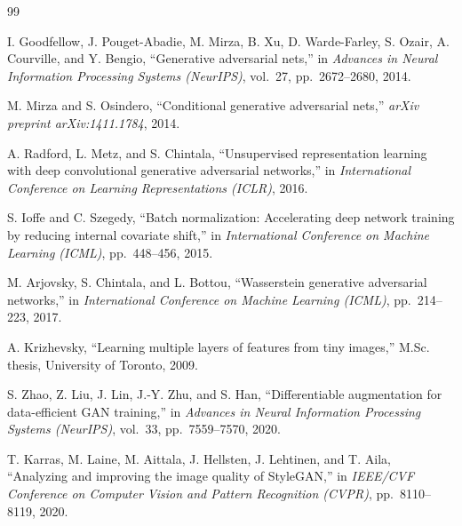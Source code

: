 \documentclass[conference]{IEEEtran}
\begin{document}

\begin{thebibliography}{99}

I. Goodfellow, J. Pouget-Abadie, M. Mirza, B. Xu, D. Warde-Farley, S. Ozair, A. Courville, and Y. Bengio,
``Generative adversarial nets,''
in \emph{Advances in Neural Information Processing Systems (NeurIPS)}, vol.~27, pp.~2672--2680, 2014.

M. Mirza and S. Osindero,
``Conditional generative adversarial nets,''
\emph{arXiv preprint arXiv:1411.1784}, 2014.

A. Radford, L. Metz, and S. Chintala,
``Unsupervised representation learning with deep convolutional generative adversarial networks,''
in \emph{International Conference on Learning Representations (ICLR)}, 2016.

S. Ioffe and C. Szegedy,
``Batch normalization: Accelerating deep network training by reducing internal covariate shift,''
in \emph{International Conference on Machine Learning (ICML)}, pp.~448--456, 2015.

M. Arjovsky, S. Chintala, and L. Bottou,
``Wasserstein generative adversarial networks,''
in \emph{International Conference on Machine Learning (ICML)}, pp.~214--223, 2017.

A. Krizhevsky,
``Learning multiple layers of features from tiny images,''
M.Sc. thesis, University of Toronto, 2009.

S. Zhao, Z. Liu, J. Lin, J.-Y. Zhu, and S. Han,
``Differentiable augmentation for data-efficient GAN training,''
in \emph{Advances in Neural Information Processing Systems (NeurIPS)}, vol.~33, pp.~7559--7570, 2020.

T. Karras, M. Laine, M. Aittala, J. Hellsten, J. Lehtinen, and T. Aila,
``Analyzing and improving the image quality of StyleGAN,''
in \emph{IEEE/CVF Conference on Computer Vision and Pattern Recognition (CVPR)}, pp.~8110--8119, 2020.

\end{thebibliography}
\end{document}
